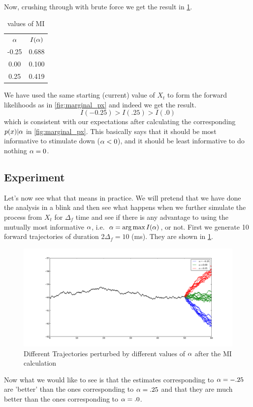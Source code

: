 \documentclass{article}
\begin{document}
Now, crushing through with brute force we get the result
in \cref{tab:MI_3alphas_basic_quad}.
\begin{table}
\begin{centering}
\begin{tabular}{cc}
${\alpha}$& $I({\alpha})$ \\
-0.25  &
 0.688 
\\
0.00 &
   0.100 
\\
   0.25 &
   0.419 
\end{tabular}
\caption{values of MI}
\label{tab:MI_3alphas_basic_quad}
\end{centering}
\end{table}
We have used the same starting (current) value of $X_t$ to form the forward
likelihoods as in \cref{fig:marginal_px} and indeed we get the result.
$$I(-0.25) >I (.25) > I(.0)$$
which is consistent with our expectations after calculating the corresponding
$p(x)|{\alpha}$ in \cref{fig:marginal_px}. This basically says that it should be most
informative to stimulate down (${\alpha}<0$), and it should be least informative to
do nothing ${\alpha}=0$.

 \subsection{Experiment}
 Let's now see what that means in practice. We will pretend that we have done the
 analysis in a blink and then see what happens when we further simulate the
 process from $X_t$ for $\Delta_f$ time and see if there is any advantage to
 using the mutually most informative ${\alpha}$, i.e.\ $\a = \argmax I(\a)$, or not. 
% 
First we generate 10 forward trajectories of duration 2$\Delta_f = 10$ (ms).
They are shown in \cref{fig:perturbed_trajectories}.
\begin{figure}[htp]
\begin{center}
  \includegraphics[width=1\textwidth]{Figs/MIML/forward_sims.pdf}
  \caption[labelInTOC]{Different Trajectories perturbed by different values of
  ${\alpha}$ after the MI calculation}
  \label{fig:perturbed_trajectories}
\end{center}
\end{figure}
% 
Now what we would like to see is that the estimates corresponding to ${\alpha}=-.25$
are 'better' than the ones corresponding to ${\alpha}=.25$ and that they are much
better than the ones corresponding to ${\alpha}=.0$.
\end{document}
